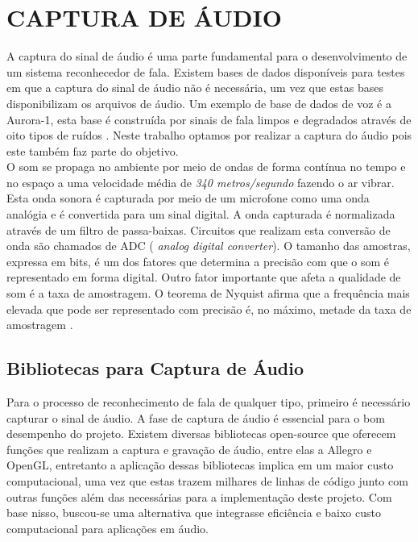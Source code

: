 \chapter{CAPTURA DE ÁUDIO}
\label{chap:cap_audio}
\thispagestyle{plain}
\quad A captura do sinal de áudio é uma parte fundamental para o desenvolvimento de um sistema reconhecedor de fala. Existem bases de dados disponíveis para testes em que a captura
do sinal de áudio não é necessária, um vez que estas bases disponibilizam os arquivos de áudio. Um exemplo de base de dados de voz é a Aurora-1, esta base é construída por sinais de fala   limpos e degradados através de oito tipos de ruídos \cite{aurora}. Neste trabalho optamos por realizar a captura do áudio pois este também faz parte do objetivo.\\ 
O som se propaga no ambiente por meio de ondas de forma contínua no tempo e no espaço a uma velocidade média de \textit{340 metros/segundo} fazendo o ar vibrar. Esta onda sonora  é capturada por meio de um microfone como uma onda analógia e  é convertida para um sinal digital. A onda capturada é normalizada através de um filtro de passa-baixas. Circuitos que realizam esta conversão de onda são chamados de  ADC (\textit{ analog digital converter}). O tamanho das amostras, expressa em bits, é um dos fatores que determina a precisão com que o som é representado em forma digital. Outro fator importante que afeta a qualidade de som é a taxa de amostragem. O teorema de Nyquist  afirma que a frequência mais elevada que pode ser representado com precisão é, no máximo, metade da taxa de amostragem \cite{nyqui}.

\section{Bibliotecas para Captura de Áudio}
\quad Para o processo de reconhecimento de fala de qualquer tipo, primeiro é necessário capturar o sinal de áudio. A fase de captura de áudio é essencial para o bom desempenho do projeto. Existem diversas bibliotecas open-source que oferecem funções que realizam a captura e gravação de áudio, entre elas a Allegro e OpenGL, entretanto a aplicação dessas bibliotecas implica em um maior custo computacional, uma vez que estas trazem milhares de linhas de código junto com outras funções além das necessárias para a implementação deste projeto. Com base nisso, buscou-se uma alternativa que integrasse eficiência e baixo custo computacional para aplicações em áudio. 
 
